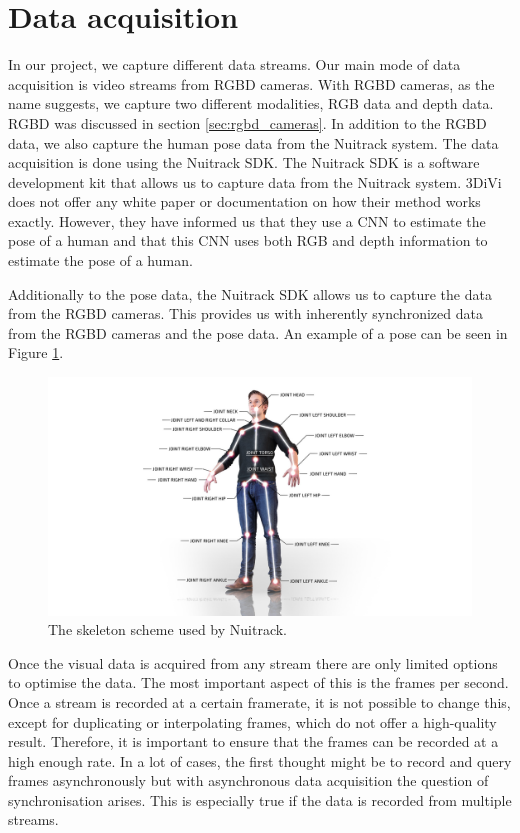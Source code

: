 \section{Data acquisition}
\label{sec:data_acquisition}

In our project, we capture different data streams. Our main mode of data acquisition is video streams from RGBD cameras. With RGBD cameras, as the name suggests, we capture two different modalities, RGB data and depth data. RGBD was discussed in section \ref{sec:rgbd_cameras}. In addition to the RGBD data, we also capture the human pose data from the Nuitrack system. The data acquisition is done using the Nuitrack SDK. The Nuitrack SDK is a software development kit that allows us to capture data from the Nuitrack system. 3DiVi does not offer any white paper or documentation on how their method works exactly. However, they have informed us that they use a CNN to estimate the pose of a human and that this CNN uses both RGB and depth information to estimate the pose of a human. 

Additionally to the pose data, the Nuitrack SDK allows us to capture the data from the RGBD cameras. This provides us with inherently synchronized data from the RGBD cameras and the pose data. An example of a pose can be seen in Figure \ref{fig:nui_skeleton}.

\begin{figure}
    \centering
    \includegraphics[width=\linewidth]{figures/HPE/Nui_skeleton_scheme.jpg}
    \caption[Nuitrack skeleton scheme]{The skeleton scheme used by Nuitrack.}
    \label{fig:nui_skeleton}
\end{figure}

Once the visual data is acquired from any stream there are only limited options to optimise the data. The most important aspect of this is the frames per second. Once a stream is recorded at a certain framerate, it is not possible to change this, except for duplicating or interpolating frames, which do not offer a high-quality result. Therefore, it is important to ensure that the frames can be recorded at a high enough rate. In a lot of cases, the first thought might be to record and query frames asynchronously but with asynchronous data acquisition the question of synchronisation arises. This is especially true if the data is recorded from multiple streams.


